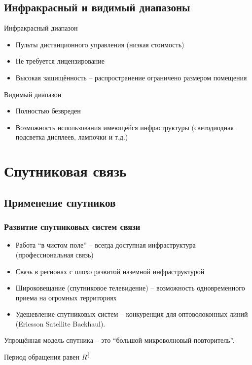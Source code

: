 \documentclass[utf8]{beamer}
\begin{document}
\subsection{Инфракрасный и видимый диапазоны}
\begin{frame}
\begin{block}{Инфракрасный диапазон}
\begin{itemize}
 \item Пульты дистанционного управления (низкая стоимость)
 \item Не требуется лицензирование
 \item Высокая защищённость -- распространение ограничено размером помещения
\end{itemize}
\end{block}
\begin{block}{Видимый диапазон}
\begin{itemize}
 \item Полностью безвреден
 \item Возможность использования имеющейся инфраструктуры (светодиодная подсветка дисплеев, лампочки и т.д.)
\end{itemize}
\end{block}
\end{frame}
\section{Спутниковая связь}
\subsection{Применение спутников}
\begin{frame}
\frametitle{Развитие спутниковых систем связи}
\begin{itemize}
 \item Работа ``в чистом поле'' -- всегда доступная инфраструктура (профессиональная связь)
 \item Связь в регионах с плохо развитой наземной инфраструктурой
 \item Широковещание (спутниковое телевидение) -- возможность одновременного приема на огромных территориях
 \item Удешевление спутниковых систем -- конкуренция для оптоволоконных линий (Ericsson Satellite Backhaul).
\end{itemize}
Упрощённая модель спутника -- это ``большой микроволновый повторитель''.

Период обращения равен $R^{\frac{3}{2}}$
\end{frame}
\end{document}
